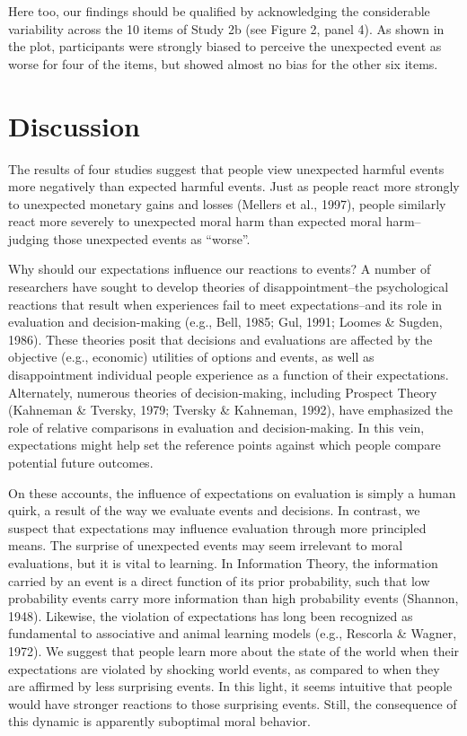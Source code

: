 \documentclass[10pt, letterpaper]{article}
\begin{document}
Here too, our findings should be qualified by acknowledging the
considerable variability across the 10 items of Study 2b (see Figure 2,
panel 4). As shown in the plot, participants were strongly biased to
perceive the unexpected event as worse for four of the items, but showed
almost no bias for the other six items.

\section{Discussion}\label{discussion}

The results of four studies suggest that people view unexpected harmful
events more negatively than expected harmful events. Just as people
react more strongly to unexpected monetary gains and losses (Mellers et
al., 1997), people similarly react more severely to unexpected moral
harm than expected moral harm--judging those unexpected events as
``worse''.

Why should our expectations influence our reactions to events? A number
of researchers have sought to develop theories of disappointment--the
psychological reactions that result when experiences fail to meet
expectations--and its role in evaluation and decision-making (e.g.,
Bell, 1985; Gul, 1991; Loomes \& Sugden, 1986). These theories posit
that decisions and evaluations are affected by the objective (e.g.,
economic) utilities of options and events, as well as disappointment
individual people experience as a function of their expectations.
Alternately, numerous theories of decision-making, including Prospect
Theory (Kahneman \& Tversky, 1979; Tversky \& Kahneman, 1992), have
emphasized the role of relative comparisons in evaluation and
decision-making. In this vein, expectations might help set the reference
points against which people compare potential future outcomes.

On these accounts, the influence of expectations on evaluation is simply
a human quirk, a result of the way we evaluate events and decisions. In
contrast, we suspect that expectations may influence evaluation through
more principled means. The surprise of unexpected events may seem
irrelevant to moral evaluations, but it is vital to learning. In
Information Theory, the information carried by an event is a direct
function of its prior probability, such that low probability events
carry more information than high probability events (Shannon, 1948).
Likewise, the violation of expectations has long been recognized as
fundamental to associative and animal learning models (e.g., Rescorla \&
Wagner, 1972). We suggest that people learn more about the state of the
world when their expectations are violated by shocking world events, as
compared to when they are affirmed by less surprising events. In this
light, it seems intuitive that people would have stronger reactions to
those surprising events. Still, the consequence of this dynamic is
apparently suboptimal moral behavior.
\end{document}
